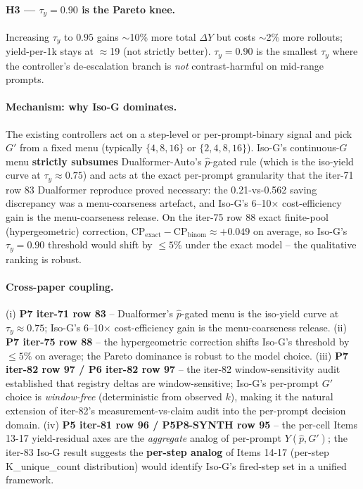 \documentclass{article}
\begin{document}
\paragraph{H3 --- $\tau_y{=}0.90$ is the Pareto knee.}
Increasing $\tau_y$ to $0.95$ gains $\sim$10\% more total
$\Delta Y$ but costs $\sim$2\% more rollouts; yield-per-1k stays
at $\approx$19 (not strictly better).  $\tau_y{=}0.90$ is the
smallest $\tau_y$ where the controller's de-escalation branch is
\emph{not} contrast-harmful on mid-range prompts.

\paragraph{Mechanism: why Iso-G dominates.}
The existing controllers act on a step-level or per-prompt-binary
signal and pick $G'$ from a fixed menu (typically $\{4, 8, 16\}$ or
$\{2, 4, 8, 16\}$).  Iso-G's continuous-$G$ menu \textbf{strictly
subsumes} Dualformer-Auto's $\hat p$-gated rule (which is the
iso-yield curve at $\tau_y \approx 0.75$) and acts at the exact
per-prompt granularity that the iter-71 row 83 Dualformer reproduce
proved necessary: the 0.21-vs-0.562 saving discrepancy was a
menu-coarseness artefact, and Iso-G's 6--10$\times$ cost-efficiency
gain is the menu-coarseness release.  On the iter-75 row 88 exact
finite-pool (hypergeometric) correction, $\mathrm{CP}_{\text{exact}}
- \mathrm{CP}_{\text{binom}} \approx +0.049$ on average, so Iso-G's
$\tau_y{=}0.90$ threshold would shift by $\le 5\%$ under the
exact model -- the qualitative ranking is robust.

\paragraph{Cross-paper coupling.}
(i) \textbf{P7 iter-71 row 83} -- Dualformer's $\hat p$-gated menu
is the iso-yield curve at $\tau_y \approx 0.75$; Iso-G's 6--10$\times$
cost-efficiency gain is the menu-coarseness release.  (ii)
\textbf{P7 iter-75 row 88} -- the hypergeometric correction
shifts Iso-G's threshold by $\le 5\%$ on average; the Pareto
dominance is robust to the model choice.  (iii) \textbf{P7
iter-82 row 97 / P6 iter-82 row 97} -- the iter-82 window-sensitivity
audit established that registry deltas are window-sensitive;
Iso-G's per-prompt $G'$ choice is \emph{window-free} (deterministic
from observed $k$), making it the natural extension of iter-82's
measurement-vs-claim audit into the per-prompt decision domain.
(iv) \textbf{P5 iter-81 row 96 / P5P8-SYNTH row 95} -- the
per-cell Items 13-17 yield-residual axes are the \emph{aggregate}
analog of per-prompt $Y(\hat p, G')$; the iter-83 Iso-G result
suggests the \textbf{per-step analog} of Items 14-17
(per-step K\_unique\_count distribution) would identify Iso-G's
fired-step set in a unified framework.
\end{document}
